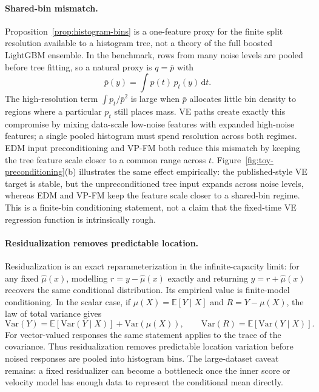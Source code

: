 \documentclass{article}
\newcommand{\E}{\mathbb{E}}
\newcommand{\Var}{\mathrm{Var}}
\newcommand{\dd}{\mathrm{d}}
\begin{document}
\paragraph{Shared-bin mismatch.} Proposition~\ref{prop:histogram-bins} is a one-feature proxy for the finite split resolution available to a histogram tree, not a theory of the full boosted LightGBM ensemble. In the benchmark, rows from many noise levels are pooled before tree fitting, so a natural proxy is $q=\bar p$ with
\[
\bar p(y)=\int p(t)\,p_t(y)\,\dd t.
\]
The high-resolution term $\int p_t/\bar p^2$ is large when $\bar p$ allocates little bin density to regions where a particular $p_t$ still places mass. VE paths create exactly this compromise by mixing data-scale low-noise features with expanded high-noise features; a single pooled histogram must spend resolution across both regimes. EDM input preconditioning and VP-FM both reduce this mismatch by keeping the tree feature scale closer to a common range across $t$. Figure~\ref{fig:toy-preconditioning}(b) illustrates the same effect empirically: the published-style VE target is stable, but the unpreconditioned tree input expands across noise levels, whereas EDM and VP-FM keep the feature scale closer to a shared-bin regime. This is a finite-bin conditioning statement, not a claim that the fixed-time VE regression function is intrinsically rough.

\paragraph{Residualization removes predictable location.} Residualization is an exact reparameterization in the infinite-capacity limit: for any fixed $\hat\mu(x)$, modelling $r=y-\hat\mu(x)$ exactly and returning $y=r+\hat\mu(x)$ recovers the same conditional distribution. Its empirical value is finite-model conditioning. In the scalar case, if $\mu(X)=\E[Y\mid X]$ and $R=Y-\mu(X)$, the law of total variance gives
\[
\Var(Y)=\E[\Var(Y\mid X)]+\Var(\mu(X)),
\qquad
\Var(R)=\E[\Var(Y\mid X)].
\]
For vector-valued responses the same statement applies to the trace of the covariance. Thus residualization removes predictable location variation before noised responses are pooled into histogram bins. The large-dataset caveat remains: a fixed residualizer can become a bottleneck once the inner score or velocity model has enough data to represent the conditional mean directly.
\end{document}
